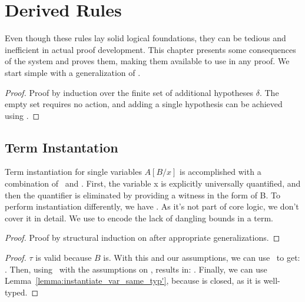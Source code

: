 \chapter{Derived Rules}\label{chapter:derived}

Even though these rules lay solid logical foundations, they can be tedious and inefficient in actual proof development.
This chapter presents some consequences of the system and proves them, making them available to use in any proof.
We start simple with a generalization of \wk.

\begin{theorem}
\end{theorem}
\begin{proof}
    Proof by induction over the finite set of additional hypotheses \(\delta\).
    The empty set requires no action, and adding a single hypothesis can be achieved using \wk.
\end{proof}

\section{Term Instantation}
Term instantiation for single variables \(A[B / x]\) is accomplished with a combination of \aIv\ and \aE.
First, the variable x is explicitly universally quantified, and then the quantifier is eliminated by providing a witness in the form of B.
To perform instantiation differently, we have .
As it's not part of core logic, we don't cover it in detail.
We use  to encode the lack of dangling bounds in a term.

\begin{lemma}
\end{lemma}
\begin{proof}
    Proof by structural induction on  after appropriate generalizations.
\end{proof}

\begin{theorem}
\end{theorem}
\begin{proof}
    \(\tau\) is valid because \(B\) is.
    With this and our assumptions, we can use \aIv\ to get: .
    Then, using \aE\ with the assumptions on , results in: .
    Finally, we can use Lemma~\ref{lemma:instantiate_var_same_typ'}, because  is closed, as it is well-typed.
\end{proof}

